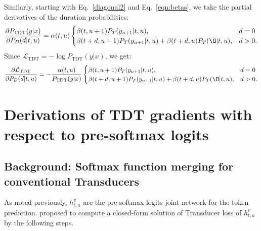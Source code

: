 \documentclass{article}
\begin{document}
Similarly, starting with Eq.~\ref{diagonal2} and Eq.~\ref{eqn:betas}, we take the partial derivatives of the duration probabilities:
\begin{equation}
    \label{duration_p}
    \frac{\partial P_\text{TDT}(y | x)} {\partial P_D(d|t,u)} = \alpha(t, u)  \begin{cases}
        \beta(t, u + 1) P_T(y_{u+1} | t, u), & d = 0 \\
        \beta(t + d, u + 1) P_T(y_{u+1} | t, u)  + \beta(t + d, u) P_T(\O | t, u), & d > 0. \\
    \end{cases}
\end{equation}
Since $\mathcal{L}_\text{TDT} =  -\log P_\text{TDT}(y | x)$, we get:
\begin{equation}
    \label{duration_all}
    \frac{\partial \mathcal{L}_\text{TDT}} {\partial P_D(d|t,u)} = -\frac{\alpha(t, u) }{P_\text{TDT}(y|x)} \begin{cases}
        \beta(t, u + 1) P_T(y_{u+1} | t, u), & d = 0 \\
        \beta(t + d, u + 1) P_T(y_{u+1} | t, u)  + \beta(t + d, u) P_T(\O | t, u), & d > 0. \\
    \end{cases}
\end{equation}






\section{ Derivations of TDT gradients with respect to pre-softmax logits}

\subsection{Background: Softmax function merging for conventional Transducers}
As noted previously, $h_{t, u}^v$ are the pre-softmax logits joint network for the token prediction. 
\cite{li2019improving} proposed to compute a closed-form solution of Transducer loss of $h_{t, u}^v$ by the following steps. 
\end{document}
